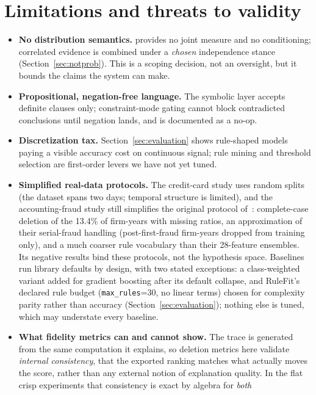 \section{Limitations and threats to validity}\label{sec:limitations}

\begin{itemize}
\item \textbf{No distribution semantics.} \pla{} provides no joint
  measure and no conditioning; correlated evidence is combined under a
  \emph{chosen} independence stance (Section~\ref{sec:notprob}). This is
  a scoping decision, not an oversight, but it bounds the claims the
  system can make.
\item \textbf{Propositional, negation-free language.} The symbolic layer
  accepts definite clauses only; constraint-mode gating cannot block
  contradicted conclusions until negation lands, and is documented as a
  no-op.
\item \textbf{Discretization tax.} Section~\ref{sec:evaluation} shows
  rule-shaped models paying a visible accuracy cost on continuous
  signal; rule mining and threshold selection are first-order levers we
  have not yet tuned.
\item \textbf{Simplified real-data protocols.} The credit-card study
  uses random splits (the dataset spans two days; temporal structure is
  limited), and the accounting-fraud study still simplifies the original
  protocol of~\cite{bao2020}: complete-case deletion of the 13.4\% of
  firm-years with missing ratios, an approximation of their serial-fraud
  handling (post-first-fraud firm-years dropped from training only), and
  a much coarser rule vocabulary than their 28-feature ensembles. Its
  negative results bind these protocols, not the hypothesis space.
  Baselines run library defaults by design, with two stated
  exceptions: a class-weighted
  variant added for gradient boosting after its default collapse, and
  RuleFit's declared rule budget (\texttt{max\_rules}=30, no linear
  terms) chosen for complexity parity rather than accuracy
  (Section~\ref{sec:evaluation}); nothing else is tuned, which may
  understate every baseline.
\item \textbf{What fidelity metrics can and cannot show.} The trace is
  generated from the same computation it explains, so deletion metrics
  here validate \emph{internal consistency}, that the exported
  ranking matches what actually moves the score, rather than any
  external notion of explanation quality. In the flat crisp
  experiments that consistency is exact by algebra for \emph{both}

\end{itemize}
